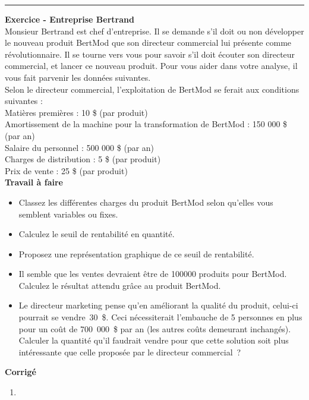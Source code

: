 \documentclass{tufte-handout}
\begin{document}
\begin{enumerate}
\noindent\rule{\textwidth}{0.5pt}
\textbf{Exercice - Entreprise Bertrand}\\
Monsieur Bertrand est chef d'entreprise. Il se demande s'il doit ou non développer le nouveau produit BertMod que son directeur commercial lui présente comme révolutionnaire. Il se tourne vers vous pour savoir s'il doit écouter son directeur commercial, et lancer ce nouveau produit. Pour vous aider dans votre analyse, il vous fait parvenir les données suivantes.\\
Selon le directeur commercial, l'exploitation de BertMod se ferait aux conditions suivantes :\\
Matières premières : 10 \$ (par produit)\\
Amortissement de la machine pour la transformation de BertMod : 150 000 \$ (par an)\\
Salaire du personnel : 500 000 \$ (par an)\\
Charges de distribution : 5 \$ (par produit)\\
Prix de vente : 25 \$ (par produit)\\
\textbf{Travail à faire}\\
\begin{itemize}
\item Classez les différentes charges du produit BertMod selon qu'elles vous semblent variables ou fixes.\\
\item Calculez le seuil de rentabilité en quantité.\\
\item Proposez une représentation graphique de ce seuil de rentabilité.\\
\item Il semble que les ventes devraient être de 100000 produits pour BertMod. Calculez le résultat attendu grâce au produit BertMod.\\
\item Le directeur marketing pense qu'en améliorant la qualité du produit, celui-ci pourrait se vendre 30 \$. Ceci nécessiterait l'embauche de 5 personnes en plus pour un coût de 700 000 \$ par an (les autres coûts demeurant inchangés). Calculer la quantité qu'il faudrait vendre pour que cette solution soit plus intéressante que celle proposée par le directeur commercial ?\\
\end{itemize}
\textbf{Corrigé}\\
\begin{enumerate}
\item 

\end{enumerate}
\end{enumerate}
\end{document}
